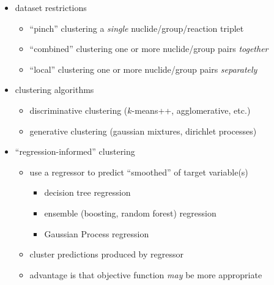 \begin{itemize}[noitemsep]
  \item dataset restrictions
  \begin{itemize}[noitemsep]
    \item ``pinch'' clustering a \textit{single} nuclide/group/reaction triplet
    \item ``combined'' clustering one or more nuclide/group pairs \textit{together}
    \item ``local'' clustering one or more nuclide/group pairs \textit{separately}
  \end{itemize}
  \item clustering algorithms
  \begin{itemize}[noitemsep]
    \item discriminative clustering ($k$-means++, agglomerative, etc.)
    \item generative clustering (gaussian mixtures, dirichlet processes)
  \end{itemize}
  \item ``regression-informed'' clustering
  \begin{itemize}[noitemsep]
    \item use a regressor to predict ``smoothed'' of target variable(s)
    \begin{itemize}[noitemsep]
      \item decision tree regression
      \item ensemble (boosting, random forest) regression
      \item Gaussian Process regression
    \end{itemize}
    \item cluster predictions produced by regressor
    \item advantage is that objective function \textit{may} be more appropriate
  \end{itemize}
\end{itemize}